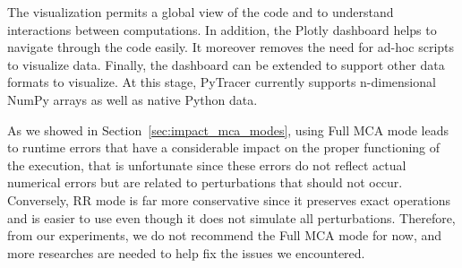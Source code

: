 \documentclass[11pt]{article}
\newcommand{\pytracer}[0]{PyTracer\xspace}
\begin{document}
The visualization permits a global view of the code and to understand interactions between computations. In addition, the Plotly dashboard helps to navigate through the code easily. It moreover removes the need for ad-hoc scripts to visualize data. Finally, the dashboard can be extended to support other data formats to visualize. At this stage, \pytracer currently supports n-dimensional NumPy arrays as well as native Python data. 

As we showed in Section~\ref{sec:impact_mca_modes}, using Full MCA mode leads to runtime errors that have a considerable impact on the proper functioning of the execution, that is unfortunate since these errors do not reflect actual numerical errors but are related to perturbations that should not occur. Conversely, RR mode is far more conservative since it preserves exact operations and is easier to use even though it does not simulate all perturbations. Therefore, from our experiments, we do not recommend the Full MCA mode for now, and more researches are needed to help fix the issues we encountered.


\end{document}
